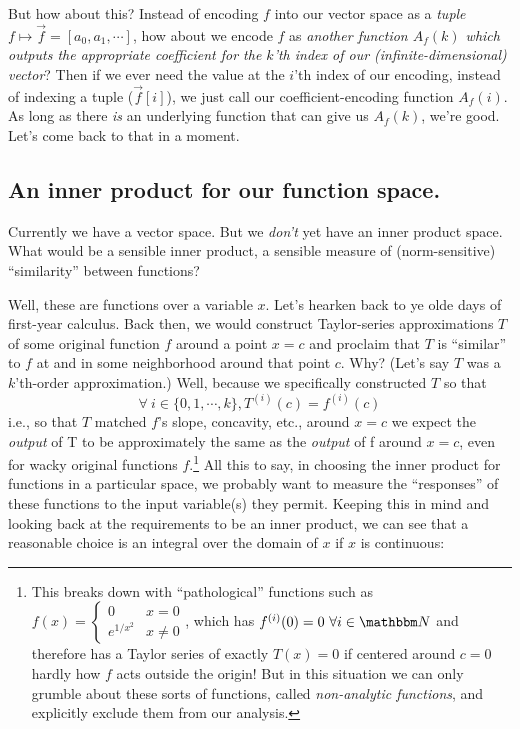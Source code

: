 \documentclass[letterpaper,12pt]{report}
\begin{document}
But how about this? 
Instead of encoding \(f\) into our vector space as a \emph{tuple}
\(f \mapsto \vec{f} = \left[a_0, a_1, \cdots \right]\), 
how about we encode 
\(f\) as \emph{another function \(A_f(k)\) which
outputs the appropriate coefficient for the \(k\)'th index of
our (infinite-dimensional) vector}?
Then if we ever need the value at the \(i\)'th index of our
encoding, instead of indexing a tuple (\(\vec{f}[i]\)),
we just call our coefficient-encoding function \(A_f(i)\).
As long as there \emph{is} an underlying function that
can give us \(A_f(k)\), we're good. Let's come back to that 
in a moment.\par

\subsection{An inner product for our function space.}

Currently we have a vector space.
But we \emph{don't} yet have an inner product space.
What would be a sensible inner product,
a sensible measure of (norm-sensitive) ``similarity''
between functions?\par

Well, these are functions over a variable \(x\).
Let's hearken back to ye olde days of first-year calculus.
Back then, we would construct Taylor-series approximations \(T\) 
of some original function \(f\) around
a point \(x=c\) and proclaim that \(T\) is ``similar'' to \(f\)
at and in some neighborhood around that point \(c\). 
Why? (Let's say \(T\) was a \(k\)'th-order approximation.)
Well, because we specifically
constructed \(T\) so that
\[\forall \ i \in \{0, 1, \cdots, k\}, T^{(i)}(c) = f^{(i)}(c)\]
\textemdash{} i.e., so that \(T\) matched \(f\)'s slope, concavity, etc., around \(x=c\)
\textemdash{}
we expect the \emph{output} of T to be approximately the same
as the \emph{output} of f around \(x=c\), even for wacky 
original functions \(f\).\footnote{
  This breaks down with ``pathological''
  functions such as
  \(f(x) = 
  \begin{cases}
    0 & x = 0 \\
    e^{1/x^2} & x \neq 0
  \end{cases}
  \),
  which has \(f^{(i)}(0) = 0 \ \forall i \in \domain{N}\)
  and therefore has a Taylor series of exactly \(T(x) = 0\)
  if centered around \(c = 0\) \textemdash{} hardly how \(f\)
  acts outside the origin!
  But in this situation we can only grumble about these sorts of functions,
  called \emph{non-analytic functions},
  and explicitly exclude them from our analysis.
}
All this to say, in choosing the inner product for functions
in a particular space,
we probably want to measure the ``responses'' of these
functions to the input variable(s) they permit.
Keeping this in mind and looking back at the requirements to
be an inner product, we can see that a reasonable choice
is an integral over the domain of \(x\) if \(x\) is continuous:
\end{document}
